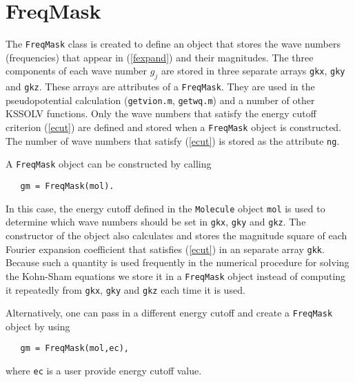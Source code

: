 \documentclass[11pt]{book}
\begin{document}
\section{FreqMask}
The {\tt FreqMask} class is created to define an object
that stores the wave numbers (frequencies) that appear
in (\ref{fexpand}) and their magnitudes. The three components of 
each wave number $g_j$ are stored in three separate arrays {\tt gkx}, 
{\tt gky} and {\tt gkz}.  These arrays are attributes of a 
{\tt FreqMask}.  They are used in the pseudopotential calculation
({\tt getvion.m}, {\tt getwq.m}) and a number of other KSSOLV functions.
Only the wave numbers that satisfy the energy cutoff criterion 
(\ref{ecut}) are defined and stored when a {\tt FreqMask} object
is constructed.  The number of wave numbers that satisfy (\ref{ecut}) 
is stored as the attribute {\tt ng}.

A {\tt FreqMask} object can be constructed by calling
\begin{verbatim}
   gm = FreqMask(mol).
\end{verbatim}
In this case, the energy cutoff defined in the {\tt Molecule} object
{\tt mol} is used to determine which wave numbers should be set 
in {\tt gkx}, {\tt gky} and {\tt gkz}. The constructor
of the object also calculates and stores the magnitude square of 
each Fourier expansion coefficient that satisfies (\ref{ecut}) 
in an separate array {\tt gkk}.  Because such a quantity is used 
frequently in the numerical procedure for solving the Kohn-Sham 
equations we store it in a {\tt FreqMask} object instead of computing 
it repeatedly from {\tt gkx}, {\tt gky} and {\tt gkz} each time
it is used.

Alternatively, one can pass in a different energy cutoff and 
create a {\tt FreqMask} object by using
\begin{verbatim}
   gm = FreqMask(mol,ec),
\end{verbatim}
where {\tt ec} is a user provide energy cutoff value.
\end{document}
